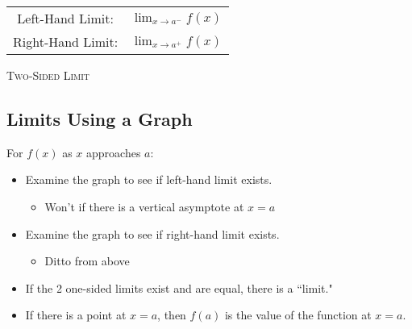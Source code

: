 \documentclass{article}
\begin{document}
\begin{tabular}{cc}
        Left-Hand Limit: & $\lim_{x\to a^-} f(x)$ \\[18pt]
        Right-Hand Limit: & $\lim_{x\to a^+} f(x)$ \\
\end{tabular}

\vfill 

\textsc{Two-Sided Limit}
    \begin{center}
    \end{center}
\vfill 
\newpage


\subsection*{Limits Using a Graph}

For $f(x)$ as $x$ approaches $a$:   
    \begin{itemize}
        \item Examine the graph to see if left-hand limit exists.  
        \begin{itemize}
            \item Won't if there is a vertical asymptote at $x=a$
        \end{itemize}
        \item Examine the graph to see if right-hand limit exists.
        \begin{itemize}
            \item Ditto from above
        \end{itemize}
        \item If the 2 one-sided limits exist and are equal, there is a ``limit."
        \item If there is a point at $x = a$, then $f(a)$ is the value of the function at $x=a$.
    \end{itemize}
\vfill 
\end{document}

